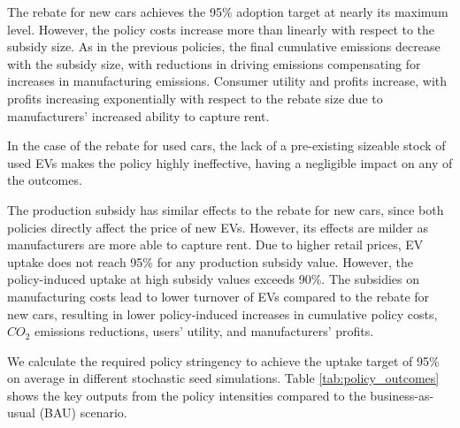 \documentclass[12pt]{article}
\begin{document}
	The rebate for new cars achieves the 95\% adoption target at nearly its maximum level. However, the policy costs increase more than linearly with respect to the subsidy size. As in the previous policies, the final cumulative emissions decrease with the subsidy size, with reductions in driving emissions compensating for increases in manufacturing emissions. Consumer utility and profits increase, with profits increasing exponentially with respect to the rebate size due to manufacturers' increased ability to capture rent.

	In the case of the rebate for used cars, the lack of a pre-existing sizeable stock of used EVs makes the policy highly ineffective, having a negligible impact on any of the outcomes.

	The production subsidy has similar effects to the rebate for new cars, since both policies directly affect the price of new EVs. However, its effects are milder as manufacturers are more able to capture rent. Due to higher retail prices, EV uptake does not reach 95\% for any production subsidy value. However, the policy-induced uptake at high subsidy values exceeds 90\%. The subsidies on manufacturing costs lead to lower turnover of EVs compared to the rebate for new cars, resulting in lower policy-induced increases in cumulative policy costs, $CO_2$ emissions reductions, users' utility, and manufacturers' profits.

	We calculate the required policy stringency to achieve the uptake target of 95\% on average in different stochastic seed simulations. Table \ref{tab:policy_outcomes} shows the key outputs from the policy intensities compared to the business-as-usual (BAU) scenario.
\end{document}
